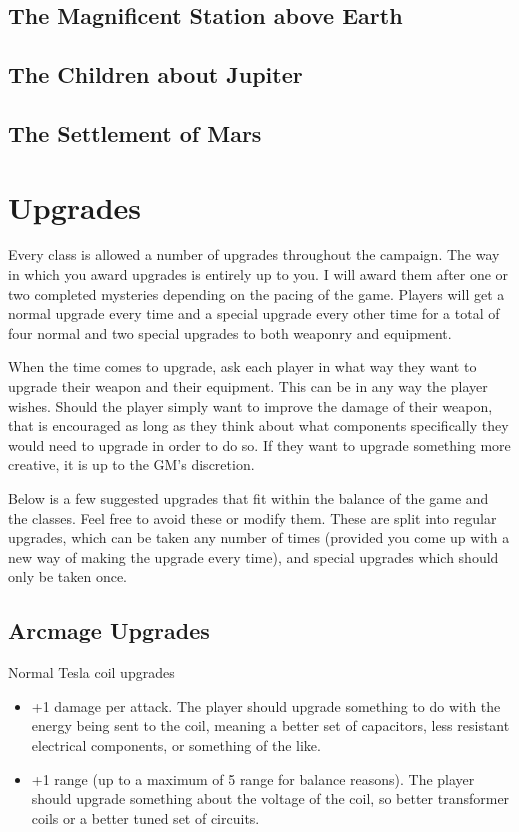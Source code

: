\documentclass[a4paper]{article}
\begin{document}
\subsection{The Magnificent Station above Earth}

\subsection{The Children about Jupiter}

\subsection{The Settlement of Mars}


\section{Upgrades}

Every class is allowed a number of upgrades throughout the campaign. The way in which you award upgrades is entirely up to you. I will award them after one or two completed mysteries depending on the pacing of the game. Players will get a normal upgrade every time and a special upgrade every other time for a total of four normal and two special upgrades to both weaponry and equipment. 

When the time comes to upgrade, ask each player in what way they want to upgrade their weapon and their equipment. This can be in any way the player wishes. Should the player simply want to improve the damage of their weapon, that is encouraged as long as they think about what components specifically they would need to upgrade in order to do so. If they want to upgrade something more creative, it is up to the GM's discretion.

Below is a few suggested upgrades that fit within the balance of the game and the classes. Feel free to avoid these or modify them. These are split into regular upgrades, which can be taken any number of times (provided you come up with a new way of making the upgrade every time), and special upgrades which should only be taken once.

\subsection{Arcmage Upgrades}

Normal Tesla coil upgrades

\begin{itemize}
\item +1 damage per attack. The player should upgrade something to do with the energy being sent to the coil, meaning a better set of capacitors, less resistant electrical components, or something of the like.
\item +1 range (up to a maximum of 5 range for balance reasons). The player should upgrade something about the voltage of the coil, so better transformer coils or a better tuned set of circuits. 
\end{itemize}
\end{document}
